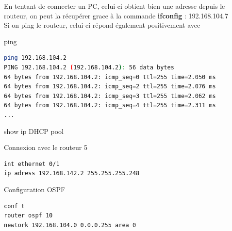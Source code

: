 \documentclass[10pt,a4paper]{article}
\begin{document}
En tentant de connecter un PC, celui-ci obtient bien une adresse depuis le routeur, on peut la récupérer grace à la commande \textbf{ifconfig} : 192.168.104.7 \\
Si on ping le routeur, celui-ci répond également positivement avec 

\noindent ping
\begin{lstlisting}[language=bash]
ping 192.168.104.2
PING 192.168.104.2 (192.168.104.2): 56 data bytes
64 bytes from 192.168.104.2: icmp_seq=0 ttl=255 time=2.050 ms
64 bytes from 192.168.104.2: icmp_seq=2 ttl=255 time=2.076 ms
64 bytes from 192.168.104.2: icmp_seq=3 ttl=255 time=2.062 ms
64 bytes from 192.168.104.2: icmp_seq=4 ttl=255 time=2.311 ms
...
\end{lstlisting}
show ip DHCP pool

\noindent Connexion avec le routeur 5
\begin{lstlisting}[language=bash]
int ethernet 0/1
ip adress 192.168.142.2 255.255.255.248
\end{lstlisting}

\noindent Configuration OSPF
\begin{lstlisting}[language=bash]
conf t
router ospf 10
newtork 192.168.104.0 0.0.0.255 area 0
\end{lstlisting}
\end{document}
